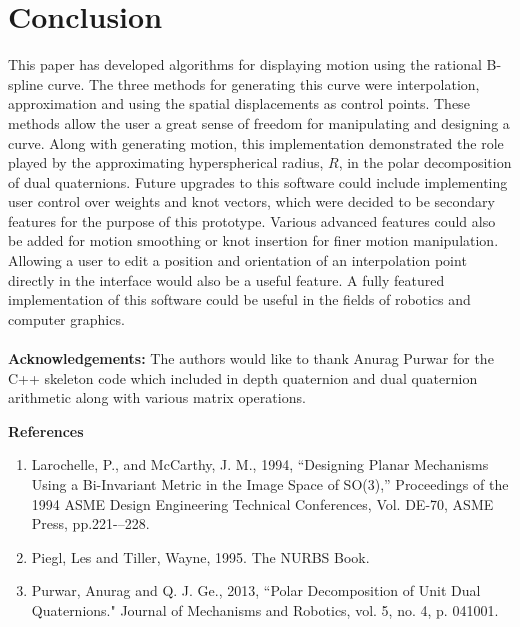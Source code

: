 \documentclass[11pt]{article}
\begin{document}
\section{Conclusion}
This paper has developed algorithms for displaying motion using the rational B-spline curve. The three methods for generating this curve were interpolation, approximation and using the spatial displacements as control points. These methods allow the user a great sense of freedom for manipulating and designing a curve. Along with generating motion, this implementation demonstrated the role played by the approximating hyperspherical radius, $R$, in the polar decomposition of dual quaternions. Future upgrades to this software could include implementing user control over weights and knot vectors, which were decided to be secondary features for the purpose of this prototype. Various advanced features could also be added for motion smoothing or knot insertion for finer motion manipulation. Allowing a user to edit a position and orientation of an interpolation point directly in the interface would also be a useful feature. A fully featured implementation of this software could be useful in the fields of robotics and computer graphics.
\\
\\
\textbf{Acknowledgements:}
The authors would like to thank Anurag Purwar for the C++ skeleton code which included in depth quaternion and dual quaternion arithmetic along with various matrix operations.

\newpage
\textbf{References}
\begin{enumerate}
   \item Larochelle, P., and McCarthy, J. M., 1994, ``Designing Planar Mechanisms Using a Bi-Invariant Metric in the Image Space of SO(3),'' Proceedings of the 1994 ASME Design Engineering Technical Conferences, Vol. DE-70, ASME Press, pp.221-–228.
  \item Piegl, Les and Tiller, Wayne, 1995. The NURBS Book.
  \item Purwar, Anurag and Q. J. Ge., 2013, ``Polar Decomposition of Unit Dual Quaternions." Journal of Mechanisms and Robotics, vol. 5, no. 4, p. 041001.
\end{enumerate}
\end{document}

